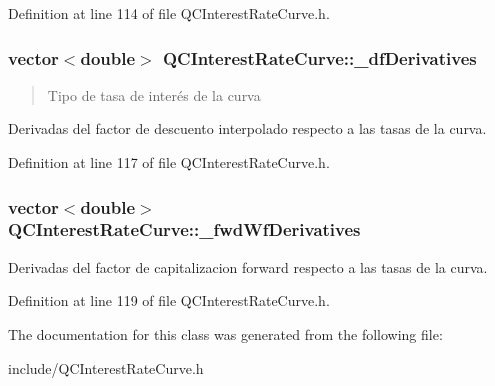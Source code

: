 Definition at line 114 of file Q\+C\+Interest\+Rate\+Curve.\+h.

\hypertarget{class_q_c_interest_rate_curve_a654de5d23f8bb2b76df9edb70acf9fca}{
\subsubsection[{\+\_\+df\+Derivatives}]{\setlength{\rightskip}{0pt plus 5cm}vector$<$double$>$ Q\+C\+Interest\+Rate\+Curve\+::\+\_\+df\+Derivatives\hspace{0.3cm}{\ttfamily [protected]}}}\label{class_q_c_interest_rate_curve_a654de5d23f8bb2b76df9edb70acf9fca}
\begin{quote}
Tipo de tasa de interés de la curva \end{quote}
Derivadas del factor de descuento interpolado respecto a las tasas de la curva. 

Definition at line 117 of file Q\+C\+Interest\+Rate\+Curve.\+h.

\hypertarget{class_q_c_interest_rate_curve_ae343e0126c675330a0fa15611db8428b}{
\subsubsection[{\+\_\+fwd\+Wf\+Derivatives}]{\setlength{\rightskip}{0pt plus 5cm}vector$<$double$>$ Q\+C\+Interest\+Rate\+Curve\+::\+\_\+fwd\+Wf\+Derivatives\hspace{0.3cm}{\ttfamily [protected]}}}\label{class_q_c_interest_rate_curve_ae343e0126c675330a0fa15611db8428b}
Derivadas del factor de capitalizacion forward respecto a las tasas de la curva. 

Definition at line 119 of file Q\+C\+Interest\+Rate\+Curve.\+h.



The documentation for this class was generated from the following file\+:\begin{DoxyCompactItemize}
\item 
include/Q\+C\+Interest\+Rate\+Curve.\+h\end{DoxyCompactItemize}
